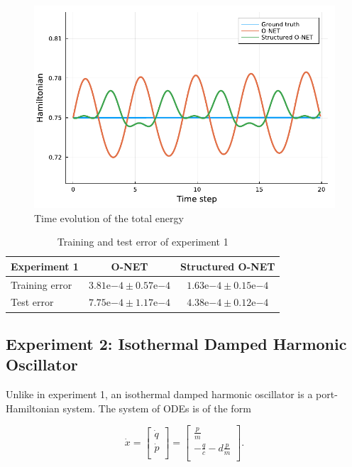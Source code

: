 \documentclass[
	parskip, 			   %
	twoside, 			   %
	DIV=14, 			   %
	BCOR=15.0mm, 		   %
	headsepline, 		   %
	open=right, 		   %
	captions=tableheading, %
	bibliography=totoc,    %
	numbers=noenddot       %
]{scrreprt}
\begin{document}
\begin{figure}[h!]
    \centering
    \includegraphics[scale=1]{figures/Hamiltonian_structured_O_NET.pdf}
    \caption{Time evolution of the total energy}
    \label{fig:Hamiltonian_error_structured_O_NET}
\end{figure}

\begin{table}[h!]
	\centering
	\caption{Training and test error of experiment 1}
	\label{tab:error_experiment1}
	\begin{tabularx}{\textwidth}{lcc}
		\toprule
		\textbf{Experiment 1} & \textbf{O-NET} & \textbf{Structured O-NET}\\
		\midrule
		Training error & $3.81\mathrm{e}{-4} \pm 0.57\mathrm{e}{-4}$ & $1.63\mathrm{e}{-4} \pm 0.15\mathrm{e}{-4}$ \\
		Test error & $7.75\mathrm{e}{-4} \pm 1.17\mathrm{e}{-4}$ & $4.38\mathrm{e}{-4} \pm 0.12\mathrm{e}{-4}$ \\
		\bottomrule
	\end{tabularx}
\end{table}



\clearpage
\subsection{Experiment 2: Isothermal Damped Harmonic Oscillator}
Unlike in experiment 1, an isothermal damped harmonic oscillator is a port-Hamiltonian system. The system of ODEs is of the form

\begin{equation}
    \label{eq:ODE_idho}
    \dot{x} =
    \begin{bmatrix}
    \dot{q}\\
    \dot{p}\\
    \end{bmatrix}
    =
    \begin{bmatrix}
    \frac{p}{m}\\
    -\frac{q}{c}-d\frac{p}{m}\\
    \end{bmatrix}.
\end{equation}
\end{document}
